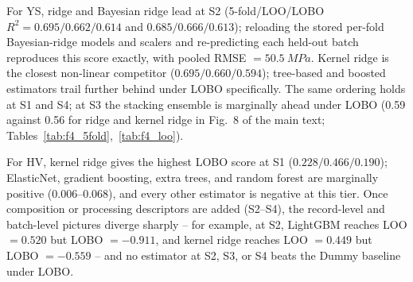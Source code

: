 \documentclass[a4paper,11pt]{article}
\begin{document}
For YS, ridge and Bayesian ridge lead at S2 (5-fold/LOO/LOBO $R^2=0.695/0.662/0.614$ and $0.685/0.666/0.613$); reloading the stored per-fold Bayesian-ridge models and scalers and re-predicting each held-out batch reproduces this score exactly, with pooled RMSE $=\SI{50.5}{MPa}$. Kernel ridge is the closest non-linear competitor ($0.695/0.660/0.594$); tree-based and boosted estimators trail further behind under LOBO specifically. The same ordering holds at S1 and S4; at S3 the stacking ensemble is marginally ahead under LOBO (0.59 against 0.56 for ridge and kernel ridge in Fig.~8 of the main text; Tables~\ref{tab:f4_5fold},~\ref{tab:f4_loo}).

For HV, kernel ridge gives the highest LOBO score at S1 ($0.228/0.466/0.190$); ElasticNet, gradient boosting, extra trees, and random forest are marginally positive (0.006--0.068), and every other estimator is negative at this tier. Once composition or processing descriptors are added (S2--S4), the record-level and batch-level pictures diverge sharply -- for example, at S2, LightGBM reaches LOO $=0.520$ but LOBO $=-0.911$, and kernel ridge reaches LOO $=0.449$ but LOBO $=-0.559$ -- and no estimator at S2, S3, or S4 beats the Dummy baseline under LOBO.
\end{document}
